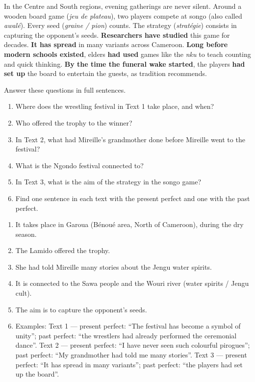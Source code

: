 \documentclass[11pt]{article}
\newcommand{\cle}[1]{{\popxbold\color{popdark}#1}}
\begin{document}
\begin{exemplebox}
In the Centre and South regions, evening gatherings are never silent. Around a wooden \cle{board game} (\emph{jeu de plateau}), two players compete at \cle{songo} (also called \emph{awalé}). Every \cle{seed} (\emph{graine / pion}) counts. The \cle{strategy} (\emph{stratégie}) consists in capturing the opponent's seeds. \textbf{Researchers have studied} this game for decades. \textbf{It has spread} in many variants across Cameroon. \textbf{Long before modern schools existed}, elders \textbf{had used} games like the \emph{nku} to teach counting and quick thinking. \textbf{By the time the funeral wake started}, the players \textbf{had set up} the board to entertain the guests, as tradition recommends.
\end{exemplebox}

\begin{exercice}
Answer these questions in full sentences.
\begin{enumerate}
\item Where does the wrestling festival in Text 1 take place, and when?
\item Who offered the trophy to the winner?
\item In Text 2, what had Mireille's grandmother done before Mireille went to the festival?
\item What is the Ngondo festival connected to?
\item In Text 3, what is the aim of the strategy in the songo game?
\item Find one sentence in each text with the present perfect and one with the past perfect.
\end{enumerate}
\end{exercice}

\begin{corrige}
\begin{enumerate}
\item It takes place in Garoua (Bénoué area, North of Cameroon), during the dry season.
\item The Lamido offered the trophy.
\item She had told Mireille many stories about the Jengu water spirits.
\item It is connected to the Sawa people and the Wouri river (water spirits / Jengu cult).
\item The aim is to capture the opponent's seeds.
\item Examples: Text 1 --- present perfect: ``The festival has become a symbol of unity''; past perfect: ``the wrestlers had already performed the ceremonial dance''. Text 2 --- present perfect: ``I have never seen such colourful pirogues''; past perfect: ``My grandmother had told me many stories''. Text 3 --- present perfect: ``It has spread in many variants''; past perfect: ``the players had set up the board''.
\end{enumerate}
\end{corrige}
\end{document}
